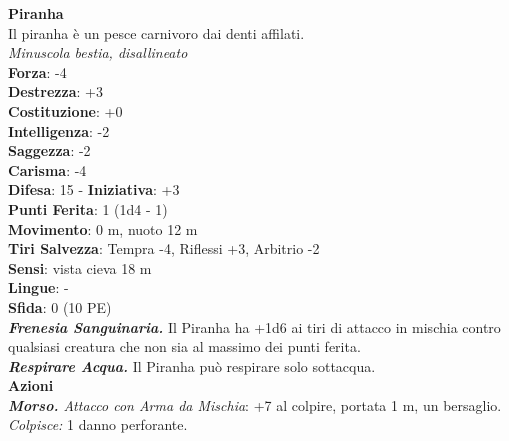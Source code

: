 \begin{multicols}{2}
\medskip\textbf{Piranha}\\
Il piranha è un pesce carnivoro dai denti affilati.\\
\emph{Minuscola bestia, disallineato}\\
\textbf{Forza}: -4\\
\textbf{Destrezza}: +3\\
\textbf{Costituzione}: +0\\
\textbf{Intelligenza}: -2\\
\textbf{Saggezza}: -2\\
\textbf{Carisma}: -4\\
\textbf{Difesa}: 15 - \textbf{Iniziativa}: +3\\
\textbf{Punti Ferita}: 1 (1d4 - 1)\\
\textbf{Movimento}: 0 m, nuoto 12 m\\
\textbf{Tiri Salvezza}: Tempra -4, Riflessi +3, Arbitrio -2 \\
\textbf{Sensi}: vista cieva 18 m\\
\textbf{Lingue}: -\\
\textbf{Sfida}: 0 (10 PE)\smallskip\\
\emph{\textbf{Frenesia Sanguinaria.}} Il Piranha ha +1d6 ai tiri di attacco in mischia contro qualsiasi creatura che non sia al massimo dei punti ferita.\\
\emph{\textbf{Respirare Acqua.}} Il Piranha può respirare solo sottacqua.\\ \smallskip\textbf{Azioni}\\
\emph{\textbf{Morso.} Attacco con Arma da Mischia}: +7 al colpire, portata 1 m, un bersaglio.
\emph{Colpisce:} 1 danno perforante.\\


\end{multicols}

